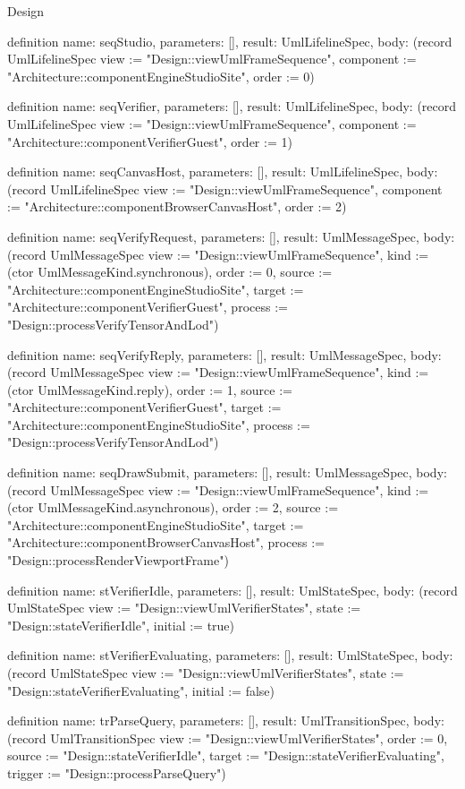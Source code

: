 \begin{lexlean}{Design}
\begin{semanticmodule}
definition{
  name: seqStudio,
  parameters: [],
  result: UmlLifelineSpec,
  body: (record UmlLifelineSpec {view := "Design::viewUmlFrameSequence", component := "Architecture::componentEngineStudioSite", order := 0})
}

definition{
  name: seqVerifier,
  parameters: [],
  result: UmlLifelineSpec,
  body: (record UmlLifelineSpec {view := "Design::viewUmlFrameSequence", component := "Architecture::componentVerifierGuest", order := 1})
}

definition{
  name: seqCanvasHost,
  parameters: [],
  result: UmlLifelineSpec,
  body: (record UmlLifelineSpec {view := "Design::viewUmlFrameSequence", component := "Architecture::componentBrowserCanvasHost", order := 2})
}

definition{
  name: seqVerifyRequest,
  parameters: [],
  result: UmlMessageSpec,
  body: (record UmlMessageSpec {view := "Design::viewUmlFrameSequence", kind := (ctor UmlMessageKind.synchronous), order := 0, source := "Architecture::componentEngineStudioSite", target := "Architecture::componentVerifierGuest", process := "Design::processVerifyTensorAndLod"})
}

definition{
  name: seqVerifyReply,
  parameters: [],
  result: UmlMessageSpec,
  body: (record UmlMessageSpec {view := "Design::viewUmlFrameSequence", kind := (ctor UmlMessageKind.reply), order := 1, source := "Architecture::componentVerifierGuest", target := "Architecture::componentEngineStudioSite", process := "Design::processVerifyTensorAndLod"})
}

definition{
  name: seqDrawSubmit,
  parameters: [],
  result: UmlMessageSpec,
  body: (record UmlMessageSpec {view := "Design::viewUmlFrameSequence", kind := (ctor UmlMessageKind.asynchronous), order := 2, source := "Architecture::componentEngineStudioSite", target := "Architecture::componentBrowserCanvasHost", process := "Design::processRenderViewportFrame"})
}

definition{
  name: stVerifierIdle,
  parameters: [],
  result: UmlStateSpec,
  body: (record UmlStateSpec {view := "Design::viewUmlVerifierStates", state := "Design::stateVerifierIdle", initial := true})
}

definition{
  name: stVerifierEvaluating,
  parameters: [],
  result: UmlStateSpec,
  body: (record UmlStateSpec {view := "Design::viewUmlVerifierStates", state := "Design::stateVerifierEvaluating", initial := false})
}

definition{
  name: trParseQuery,
  parameters: [],
  result: UmlTransitionSpec,
  body: (record UmlTransitionSpec {view := "Design::viewUmlVerifierStates", order := 0, source := "Design::stateVerifierIdle", target := "Design::stateVerifierEvaluating", trigger := "Design::processParseQuery"})
}


\end{semanticmodule}
\end{lexlean}
